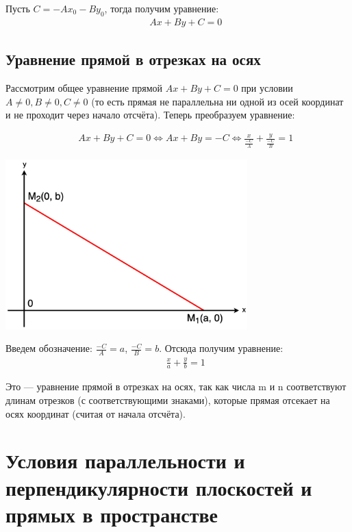 \documentclass[12pt, fleqn]{extarticle}
\begin{document}
Пусть \(C = -Ax_0 - By_0\), тогда получим уравнение:
\begin{align*}
     &  &
    Ax + By + C = 0
\end{align*}

\subsection*{Уравнение прямой в отрезках на осях}

Рассмотрим общее уравнение прямой \(Ax + By + C = 0\) при условии \(A \neq 0, B \neq 0, C \neq 0\) (то есть прямая не параллельна ни одной из осей координат и не проходит через начало отсчёта).
Теперь преобразуем уравнение:

\begin{align*}
     &  &
    Ax + By + C = 0  \iff Ax + By = -C \iff \frac{x}{\frac{-C}{A}} + \frac{y}{\frac{-C}{B}} = 1
\end{align*}

\begin{center}
    \includegraphics[width=0.7\textwidth]{axis_line.png}
\end{center}

Введем обозначение: \(\frac{-C}{A} = a\), \(\frac{-C}{B} = b\).
Отсюда получим уравнение:
\begin{align*}
     &  &
    \frac{x}{a} + \frac{y}{b} = 1
\end{align*}

Это — уравнение прямой в отрезках на осях, так как числа m и n соответствуют длинам отрезков (с соответствующими знаками), которые прямая отсекает на осях координат (считая от начала отсчёта).

\newpage

\section{Условия параллельности и перпендикулярности плоскостей и прямых в пространстве}
\label{sec:parallel_perpendicular_planes}
\end{document}
